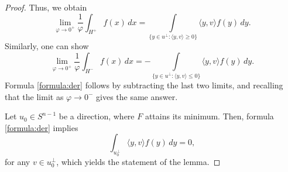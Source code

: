 \documentclass[10pt,a4paper]{amsart}
\begin{document}
\begin{proof}
						
						
					
						Thus, we obtain
						$$\lim_{\varphi\to 0^+} \frac1{\varphi}	\int_{H^+} f(x) \, dx = \int\limits_{\{ y\in u^\perp:\langle y,v\rangle\ge 0\}} \langle y,v\rangle f(y)\, dy.$$
						Similarly, one can show 
							$$\lim_{\varphi\to 0^+} \frac1{\varphi}	\int_{H^-} f(x) \, dx =  - \int\limits_{\{ y\in u^\perp:\langle y,v\rangle\le 0\}} \langle y,v\rangle f(y)\, dy.$$
						Formula \eqref{formula:der} follows by subtracting the last two limits, and recalling that the limit as $\varphi\to 0^-$ gives the same answer.
							
					 Let $u_0 \in S^{n-1}$ be a direction, where $F$ attains its minimum. Then,   formula \eqref{formula:der} implies
					 $$\int_{u_0^\perp} \langle y,v\rangle f(y) \, dy=0,$$ for any $v\in u_0^\perp$, which yields the statement of the lemma.
					 
			 
				
			\end{proof}
\end{document}
